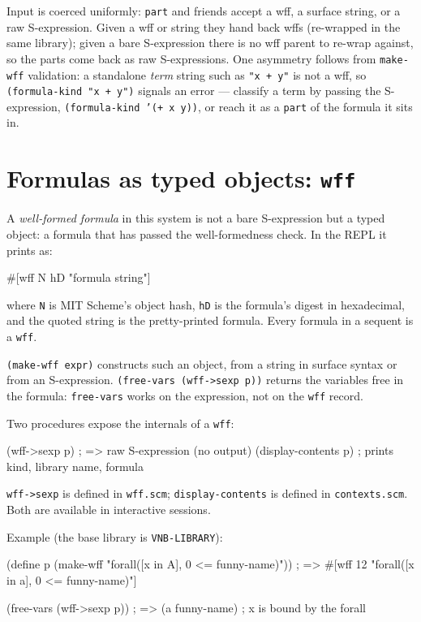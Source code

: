 \begin{remark}
Input is coerced uniformly: \texttt{part} and friends accept a wff, a
surface string, or a raw S-expression.  Given a wff or string they hand
back wffs (re-wrapped in the same library); given a bare S-expression there
is no wff parent to re-wrap against, so the parts come back as raw
S-expressions.  One asymmetry follows from \texttt{make-wff} validation: a
standalone \emph{term} string such as \texttt{"x + y"} is not a wff, so
\texttt{(formula-kind "x + y")} signals an error --- classify a term by
passing the S-expression, \texttt{(formula-kind '(+ x y))}, or reach it as
a \texttt{part} of the formula it sits in.
\end{remark}



\section{Formulas as typed objects: \texttt{wff}}
\label{chap:syntax-contexts}

A \emph{well-formed formula} in this system is not a bare S-expression
but a typed object: a formula that has passed the well-formedness check.  In the REPL it prints as:
\begin{VNBsnip}
#[wff N hD "formula string"]
\end{VNBsnip}
where \texttt{N} is MIT Scheme's object hash, \texttt{hD} is the
formula's digest in hexadecimal, and the quoted string is the
pretty-printed formula.  Every formula in a sequent is a \texttt{wff}.

\texttt{(make-wff expr)} constructs such an object, from a string in
surface syntax or from an S-expression.  \texttt{(free-vars (wff->sexp p))}
returns the variables free in the formula: \texttt{free-vars} works on
the expression, not on the \texttt{wff} record.

Two procedures expose the internals of a \texttt{wff}:
\begin{VNBsnip}
(wff->sexp p)        ; => raw S-expression (no output)
(display-contents p) ; prints kind, library name, formula
\end{VNBsnip}
\texttt{wff->sexp} is defined in \texttt{wff.scm};
\texttt{display-contents} is defined in \texttt{contexts.scm}.
Both are available in interactive sessions.

Example (the base library is \texttt{VNB-LIBRARY}):
\begin{VNBsnip}
(define p (make-wff "forall([x in A], 0 <= funny-name)"))
; => #[wff 12 "forall([x in a], 0 <= funny-name)"]

(free-vars (wff->sexp p))
; => (a funny-name)   ; x is bound by the forall
\end{VNBsnip}


